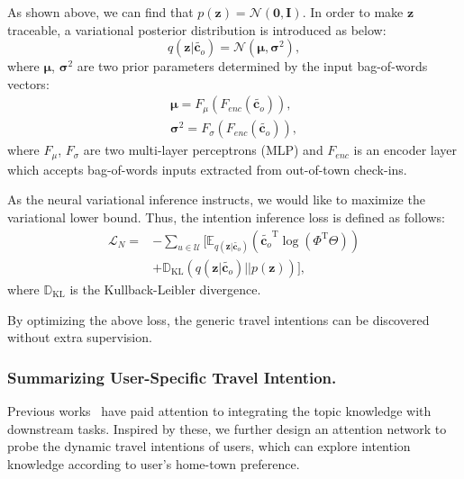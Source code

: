 \documentclass[letterpaper]{article} %
\begin{document}
As shown above, we can find that $p(\mathbf{z}) = \mathcal{N}\left(\mathbf{0}, \mathbf{I}\right)$. In order to make $\mathbf{z}$ traceable, a variational posterior distribution is introduced as below:
\begin{equation}\label{e:variational}
    q(\mathbf{z}|\widetilde{\mathbf{c}_o}) =
    \mathcal{N}\left(\bm{\mu},\bm{\sigma}^2 \right) ,
\end{equation}
where $\bm{\mu}$, $\bm{\sigma}^2$ are two prior parameters determined by the input bag-of-words vectors:
\begin{equation}\label{e:mu_sigma}
    \begin{split}
        \bm{\mu} =
        F_{\mu}\left(F_{enc}\left(\widetilde{\mathbf{c}_o}\right)\right)  ,
        \\
        \bm{\sigma}^2 =
        F_{\sigma}\left(F_{enc}\left(\widetilde{\mathbf{c}_o}\right)\right) ,
    \end{split}
\end{equation}
where $F_{\mu}$, $F_{\sigma}$ are two multi-layer perceptrons (MLP) and $F_{enc}$ is an encoder layer which accepts bag-of-words inputs extracted from out-of-town check-ins.

As the neural variational inference {instructs}, we would like to maximize the variational lower bound.
Thus, the intention inference loss is defined as follows:
\begin{equation}\label{e:ntm_loss}
    \begin{split}
        \mathcal{L}_N = & - \sum _ {u \in \mathcal{U}} \Big[\mathbb{E}_{q(\mathbf{z}|\widetilde{\mathbf{c}_o})}
        \left(\widetilde{\mathbf{c}_o}^\mathrm{T}
        \log{\left(\Phi^\mathrm{T}\Theta\right)}\right)
        \\
        & + \mathbb{D}_{\mathrm{KL}}
        \left(q\left(\mathbf{z}|\widetilde{\mathbf{c}_o}\right)
        ||p\left(\mathbf{z}\right)\right)\Big] ,
    \end{split}
\end{equation}
where $\mathbb{D}_{\mathrm{KL}}$ is the Kullback-Leibler divergence.

By optimizing the above loss, the generic travel intentions can be discovered without extra supervision.


\subsubsection{Summarizing User-Specific Travel Intention.}
Previous works~\cite{zeng2018topic,wei2019modeling} have paid attention to integrating the topic knowledge with downstream tasks.
Inspired by these, we further design an attention network to probe the  dynamic travel intentions of users, which can explore intention knowledge according to user's home-town preference.
\end{document}
